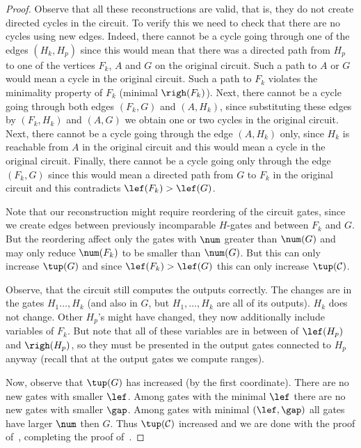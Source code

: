 \begin{proof}[Proof]
    Observe that all these reconstructions are valid, that is, they do not create directed cycles in the circuit. To verify this we need to check that there are no cycles using new edges. Indeed, there cannot be a cycle going through one of the edges $(H_k,H_p)$ since this would mean that there was a directed path from $H_p$ to one of the vertices $F_k$, $A$ and $G$ on the original circuit. Such a path to $A$ or $G$ would mean a cycle in the original circuit. Such a path to $F_k$ violates the minimality property of $F_k$ (minimal $\righ(F_k)$). Next, there cannot be a cycle going through both edges $(F_k,G)$ and $(A,H_k)$, since substituting these edges by $(F_k,H_k)$ and $(A,G)$ we obtain one or two cycles in the original circuit. Next, there cannot be a cycle going through the edge $(A,H_k)$ only, since $H_k$ is reachable from $A$ in the original circuit and this would mean a cycle in the original circuit. Finally, there cannot be a cycle going only through the edge $(F_k,G)$ since this would mean a directed path from $G$ to $F_k$ in the original circuit and this contradicts $\lef(F_k)>\lef(G)$.

    Note that our reconstruction might require reordering of the circuit gates, since we create edges between previously incomparable $H$-gates and between $F_k$ and $G$. But the reordering affect only the gates with $\num$ greater than $\num(G)$ and may only reduce $\num(F_k)$ to be smaller than $\num(G)$. But this can only increase $\tup(G)$ and since $\lef(F_k)>\lef(G)$ this can only increase $\tup({\cal C})$.

    Observe, that the circuit still computes the outputs correctly. The changes are in the gates $H_1\ldots, H_k$ (and also in $G$, but $H_1,\ldots, H_k$ are all of its outputs). $H_k$ does not change. Other $H_p$'s might have changed, they now additionally include variables of $F_k$. But note that all of these variables are in between of $\lef(H_p)$ and $\righ(H_p)$, so they must be presented in the output gates connected to $H_p$ anyway (recall that at the output gates we compute ranges).

    Now, observe that $\tup(G)$ has increased (by the first coordinate). There are no new gates with smaller $\lef$. Among gates with the minimal $\lef$ there are no new gates with smaller $\gap$. Among gates with minimal $(\lef,\gap)$ all gates have larger $\num$ then $G$. Thus $\tup({\cal C})$ increased
    and we are done  %
%
	with the proof of~,
	completing the proof of~.
\end{proof}

